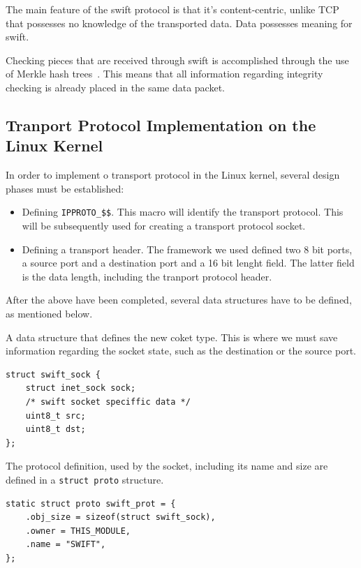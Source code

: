 The main feature of the swift protocol is that it's content-centric, unlike
TCP that possesses no knowledge of the transported data. Data possesses
meaning for swift.

Checking pieces that are received through swift is accomplished through the
use of Merkle hash trees~\cite{TODO}. This means that all information
regarding integrity checking is already placed in the same data packet.

\subsection{Tranport Protocol Implementation on the Linux Kernel}

In order to implement o transport protocol in the Linux kernel, several design
phases must be established:

\begin{itemize}
  \item Defining \texttt{IPPROTO\_\$\$}. This macro will identify the
  transport protocol. This will be subsequently used for creating a transport
  protocol socket.
  \item Defining a transport header. The framework we used defined two 8 bit
  ports, a source port and a destination port and a 16 bit lenght field. The
  latter field is the data length, including the tranport protocol header.
\end{itemize}

After the above have been completed, several data structures have to be
defined, as mentioned below.

A data structure that defines the new coket type. This is where we must save
information regarding the socket state, such as the destination or the source
port.
\begin{verbatim}
struct swift_sock {
    struct inet_sock sock;
    /* swift socket speciffic data */
    uint8_t src;
    uint8_t dst;
};
\end{verbatim}

The protocol definition, used by the socket, including its name and size are
defined in a \texttt{struct proto} structure.
\begin{verbatim}
static struct proto swift_prot = {
    .obj_size = sizeof(struct swift_sock),
    .owner = THIS_MODULE,
    .name = "SWIFT",
};
\end{verbatim}

